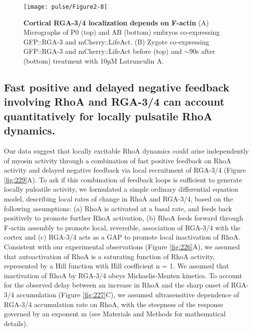 \begin{figure}[!htbp]
\centering
\texttt{[image: pulse/Figure2-8]}

\caption[Cortical RGA-3/4 localization depends on F-actin]{\label{fig:228}\textbf{Cortical RGA-3/4 localization depends on F-actin} (A) Micrographs of P0 (top) and AB (bottom) embryos co-expressing GFP::RGA-3 and mCherry::LifeAct. (B) Zygote co-expressing GFP::RGA-3 and mCherry::LifeAct before (top) and $\sim$90s after (bottom) treatment with 10µM Latrunculin A.}
\end{figure}



\subsection{Fast positive and delayed negative feedback involving RhoA and RGA-3/4 can account quantitatively for locally pulsatile RhoA dynamics.}
\label{sec:25}
Our data suggest that locally excitable RhoA dynamics could arise independently of myosin activity through a combination of fast positive feedback on RhoA activity and delayed negative feedback via local recruitment of RGA-3/4 (Figure \ref{fig:229}A).  To ask if this combination of feedback loops is sufficient to generate locally pulsatile activity, we formulated a simple ordinary differential equation model, describing local rates of change in RhoA and RGA-3/4, based on the following assumptions:  (a)  RhoA is activated at a basal rate, and feeds back positively to promote further RhoA activation, (b) RhoA feeds forward through F-actin assembly to promote local, reversible, association of RGA-3/4 with the cortex and (c) RGA-3/4 acts as a GAP to promote local inactivation of RhoA. Consistent with our experimental observations (Figure \ref{fig:226}A), we assumed that autoactivation of RhoA is a saturating function of RhoA activity, represented by a Hill function with Hill coefficient n = 1. We assumed that inactivation of RhoA by RGA-3/4 obeys Michaelis-Menten kinetics. To account for the observed delay between an increase in RhoA and the sharp onset of RGA-3/4 accumulation (Figure \ref{fig:227}C), we assumed ultrasensitive dependence of RGA-3/4 accumulation rate on RhoA, with the steepness of the response governed by an exponent m (see Materials and Methods for mathematical details). 



